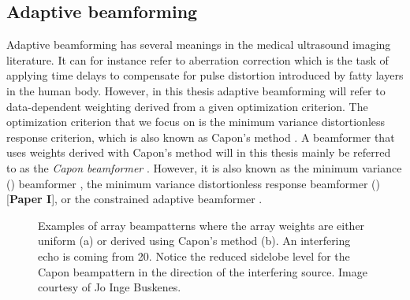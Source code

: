 \subsection{Adaptive beamforming}\label{sec:adaptbf}
Adaptive beamforming has several meanings in the medical ultrasound imaging literature. It can for instance refer to aberration correction \cite{cole1996method} which is the task of applying time delays to compensate for pulse distortion introduced by fatty layers in the human body. However, in this thesis adaptive beamforming will refer to data-dependent weighting derived from a given optimization criterion. The optimization criterion that we focus on is the minimum variance distortionless response criterion, which is also known as Capon's method \cite{Capon1969}. A beamformer that uses weights derived with Capon's method will in this thesis mainly be referred to as the \textit{Capon beamformer} \cite{Vignon2008}. However, it is also known as the minimum variance  () beamformer \cite{Synnevag2007}, the minimum variance distortionless response beamformer () [\textbf{Paper I}], or the constrained adaptive beamformer \cite{Mann2002}.

\begin{figure}[t!]
\caption{Examples of array beampatterns where the array weights are either uniform (a) or derived using Capon's method (b). An interfering echo is coming from 20\degree. Notice the reduced sidelobe level for the Capon beampattern in the direction of the interfering source. Image courtesy of Jo Inge Buskenes.}
\label{fig:weights}
\end{figure}

